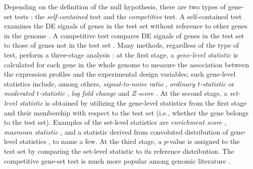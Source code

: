 \documentclass[a4,center,fleqn]{NAR}
\begin{document}
Depending on the definition of the null hypothesis, there are two types of gene-set tests
\citep{goeman2007analyzing}: the \textit{self-contained} test and the \textit{competitive} 
test. A self-contained test examines the DE signals of genes in the test set without reference 
to other genes in the genome 	
\citep{goeman2005testing,goeman2004global,huang2013gene,tsai2009multivariate,wu2010roast}. A 
competitive test compares DE signals of genes in the test set to those of genes not in the test 
set \citep{tian2005discovering,wu2012camera,yaari2013quantitative}. Many methods, regardless of 
the type of test, perform a three-stage analysis
\citep{khatri2012ten}: at the first stage, a \textit{gene-level statistic} is calculated for 
each gene in the whole genome to measure the association between the expression profiles and the
experimental design variables; such gene-level statistics include, among others,
\textit{signal-to-noise ratio} \citep{subramanian2005gene}, \textit{ordinary $t$-statistic}
\citep{tian2005discovering} or \textit{moderated $t$-statistic} \citep{Smyth2004moderated},
\textit{log fold change} \citep{kim2005page} and \textit{$Z$-score} 
\citep{efron2007correlation}. At
the second stage, a \textit{set-level statistic} is obtained by utilizing the gene-level 
statistics
from the first stage and their membership with respect to the test set (i.e., whether the gene
belongs to the test set). Examples of the set-level statistics are \textit{enrichment score}
\citep{subramanian2005gene}, \textit{maxmean statistic} \citep{efron2007testing}, and a 
statistic derived from convoluted distribution of gene-level statistics 
\citep{yaari2013quantitative}, to name
a few. At the third stage, a $p$-value is assigned to the test set by comparing the set-level
statistic to its reference distribution. The competitive gene-set test is much more popular 
among genomic literature \citep{gatti2010heading,goeman2007analyzing}.  

\end{document}
